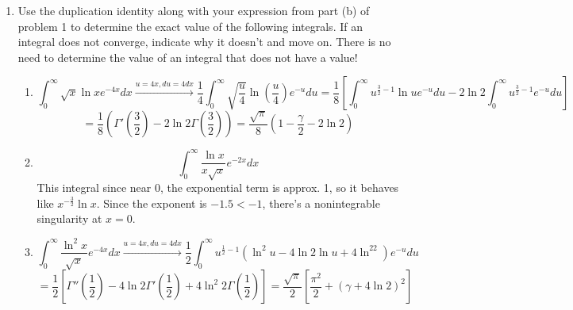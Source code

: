 \documentclass{article}
\begin{document}
\begin{enumerate}
\begin{enumerate}
        \[\boxed{\therefore \Gamma''\left(\frac 1 2\right)  = \sqrt{\pi}\left[ \frac{\pi^2}{2} + (\gamma + 2 \ln 2)^2\right]}\]
        \item Use the recurrence relation in conjunction with your result from part (c) to determine the exact values of $\Gamma'(\frac 3 2), \Gamma''(\frac 3 2)$
        \\ \\ 
        By the product rule, 
        \[\Gamma'(z+1) = \Gamma(z) + z\Gamma'(z), \Gamma''(z+1) = 2\Gamma'(z) + z\Gamma''(z)\]
        Thus, 
        \[\boxed{\Gamma'\left(\frac 3 2\right) = \sqrt{\pi} \left( 1 - \frac{\gamma}{2} - \ln 2\right)}\]
        \[\boxed{\Gamma''\left( \frac 3 2\right) = \sqrt{\pi} \left[ \frac{\pi^2}{4} + \frac{(\gamma + 2\ln 2)^2}{2} - 2(\gamma + 2 \ln 2)\right]}\]
    \end{enumerate}
    \item Use the duplication identity along with your expression from part (b) of problem 1 to determine the exact value of the following integrals. If an integral does not converge, indicate why it doesn't and move on. There is no need to determine the value of an integral that does not have a value!
    \begin{enumerate}
        \item 
        \[\int_{0}^{\infty} \sqrt{x}\ln x e^{-4x}dx \xrightarrow{ u = 4x, du = 4 dx} \frac 1 4\int_{0}^{\infty} \sqrt{\frac{u}{4}}\ln(\frac u 4)e^{-u}du = \frac{1}{8} \left[\int_{0}^{\infty} u^{\frac 3 2 - 1}\ln ue^{-u} du - 2 \ln 2 \int_{0}^{\infty} u^{\frac 3 2 - 1}e^{-u}du\right]\]
        \[ = \frac{1}{8} \left( \Gamma'\left(\frac 3 2\right) - 2 \ln 2 \Gamma\left( \frac 3 2 \right)\right) = \boxed{\frac{\sqrt{\pi}}{8} \left( 1 - \frac{\gamma}{2} - 2 \ln 2\right)}\]
        \item  
        \[\int_{0}^{\infty} \frac{\ln x}{x \sqrt x}e^{-2x}dx\]
        This integral  since near 0, the exponential term is approx. 1, so it behaves like $x^{-\frac 3 2}\ln x$. Since the exponent is $-1.5<-1$, there's a nonintegrable singularity at $x=0$.
        \item 
        \[\int_{0}^{\infty} \frac{\ln^2 x}{\sqrt x}e^{-4x}dx \xrightarrow{u = 4x, du = 4 dx} \frac 1 2 \int_{0}^{\infty} u^{\frac 1 2 - 1}(\ln^2 u -4\ln 2 \ln u + 4\ln^22)e^{-u}du\]
        \[ = \frac 1 2 \left[ \Gamma''\left( \frac 1 2\right)- 4 \ln 2 \Gamma'\left( \frac 1 2\right) + 4 \ln^2 2 \Gamma \left( \frac 1 2\right)\right] = \boxed{\frac{\sqrt{\pi}}{2} \left[ \frac{\pi^2}{2}+ (\gamma + 4\ln 2)^2\right]}\]

\end{enumerate}
\end{enumerate}
\end{document}
